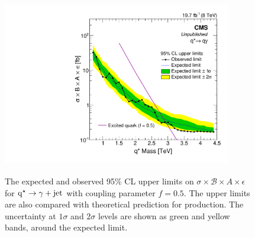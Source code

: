 \begin{figure}[h!]
\centering
\includegraphics[width=10cm,height=8cm]{ch6/plots/ExcitedQuarksToGJ_f0p5_ObseExp_xsAccEff_Limits_fb.pdf}
 \caption{The expected and observed 95\% CL upper limits on $\sigma\times\mathcal{B}\times{A}\times\epsilon$ for $\mathrm{q^\star}\to\gamma+\mathrm{jet}$ with coupling
          parameter $f=0.5$. The upper limits are also compared with theoretical prediction for \qstar production. The uncertainty at $1\sigma$ 
          and $2\sigma$ levels are shown as green and yellow bands, around the expected limit.}
\label{fig:qstarLimithalf}
\end{figure}


